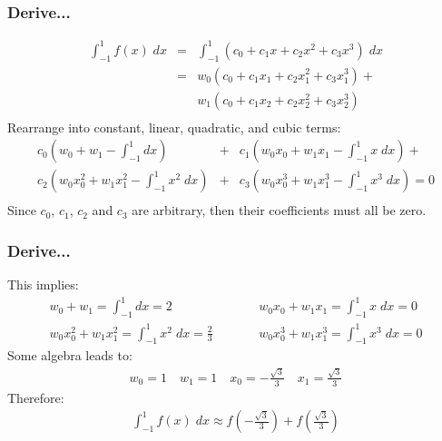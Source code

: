 \documentclass[10pt]{beamer}
\begin{document}
\begin{frame}
\frametitle{Derive...}
\begin{eqnarray*}
 \int_{-1}^1 f(x) \; \mathit{dx} &=& \int_{-1}^1 \left( c_0 + c_1 x +
 c_2 x^2 + c_3 x^3 \right) \; \mathit{dx} \\
       &=& w_0 \left(c_0 + c_1 x_1 + c_2 x_1^2 + c_3 x_1^3 \right) +   \\
       & & w_1 \left(c_0 + c_1 x_2 + c_2 x_2^2 + c_3 x_2^3 \right) \\
\end{eqnarray*}
Rearrange into constant, linear, quadratic, and cubic terms:
\begin{eqnarray*}
 c_0 \left(w_0 + w_1 - \int_{-1}^1 \mathit{dx} \right)
&+&  c_1 \left(w_0x_0 + w_1x_1 - \int_{-1}^1 x\;\mathit{dx}
\right)+\\
c_2 \left(w_0x_0^2 + w_1x_1^2 - \int_{-1}^1
x^2\;\mathit{dx}
 \right)
&+&  c_3 \left(w_0x_0^3 + w_1x_1^3 - \int_{-1}^1 x^3\;\mathit{dx}
 \right)  = 0\\
\end{eqnarray*}
Since $c_0$, $c_1$, $c_2$ and $c_3$ are arbitrary, then their
coefficients must all be zero.  
\end{frame}
\begin{frame}
\frametitle{Derive...}
This implies:
\begin{eqnarray*}
  w_0 + w_1 = \int_{-1}^1 \mathit{dx} = 2 &\qquad&
  w_0x_0 + w_1x_1 = \int_{-1}^1 x\;\mathit{dx} = 0 \\
  w_0x_0^2 + w_1x_1^2 = \int_{-1}^1 x^2\;\mathit{dx} = \frac{2}{3} &\qquad&
  w_0x_0^3 + w_1x_1^3 = \int_{-1}^1 x^3\;\mathit{dx} = 0
\end{eqnarray*}
Some algebra leads to:
\begin{eqnarray*}
  w_0 = 1 \quad w_1 = 1 \quad x_0 = -\frac{\sqrt{3}}{3}
         \quad x_1 = \frac{\sqrt{3}}{3}
\end{eqnarray*}
Therefore:
\begin{eqnarray*}
  \int_{-1}^1 f(x) \; \mathit{dx} \approx f\left(-\frac{\sqrt{3}}{3}
  \right) + f\left(\frac{\sqrt{3}}{3} \right)
\end{eqnarray*}
\end{frame}
\end{document}
